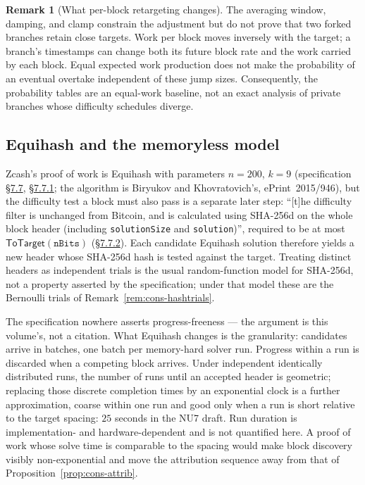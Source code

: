\documentclass[11pt,a4paper]{article}
\theoremstyle{definition}
\newtheorem{remark}[theorem]{Remark}
\begin{document}
\begin{remark}[What per-block retargeting changes]
\label{rem:cons-difffidelity}
The averaging window, damping, and clamp constrain the adjustment but do
not prove that two forked branches retain close targets. Work per block
moves inversely with the target; a branch's timestamps can change both
its future block rate and the work carried by each block. Equal expected
work production does not make the probability of an eventual overtake
independent of these jump sizes. Consequently, the probability tables are
an equal-work baseline, not an exact analysis of private branches whose
difficulty schedules diverge.
\end{remark}

\subsection{Equihash and the memoryless model}\label{sec:cons-equihash}

Zcash's proof of work is Equihash with parameters $n = 200$, $k = 9$
(specification \href{https://zips.z.cash/protocol/protocol.pdf\#pow}{\S7.7}, \href{https://zips.z.cash/protocol/protocol.pdf\#equihash}{\S7.7.1}; the algorithm is Biryukov and
Khovratovich's, ePrint~2015/946), but the difficulty test a block must also pass
is a separate later step: ``[t]he difficulty filter is unchanged from
Bitcoin, and is calculated using SHA-256d on the whole block header
(including \texttt{solutionSize} and \texttt{solution})'', required to
be at most $\mathsf{ToTarget}(\texttt{nBits})$ (\href{https://zips.z.cash/protocol/protocol.pdf\#difficulty}{\S7.7.2}). Each
candidate Equihash solution therefore yields a new header whose SHA-256d
hash is tested against the target.
Treating distinct headers as independent trials is the usual random-function
model for SHA-256d, not a property asserted by the specification; under that
model these are the Bernoulli trials of Remark~\ref{rem:cons-hashtrials}.

The specification nowhere asserts progress-freeness --- the argument
is this volume's, not a citation. What Equihash changes is the
granularity: candidates arrive in batches, one batch per memory-hard
solver run.
Progress within a run is discarded when a competing block arrives. Under
independent identically distributed runs, the number of runs until an accepted
header is geometric; replacing those discrete completion times by an
exponential clock is a further approximation, coarse within one run and good
only when a run is short relative to the target spacing: $25$ seconds in
the NU7 draft. Run duration is
implementation- and hardware-dependent and is not quantified here. A
proof of work whose solve time is comparable to the spacing would make block
discovery visibly non-exponential and move the attribution sequence away from
that of Proposition~\ref{prop:cons-attrib}.
\end{document}

